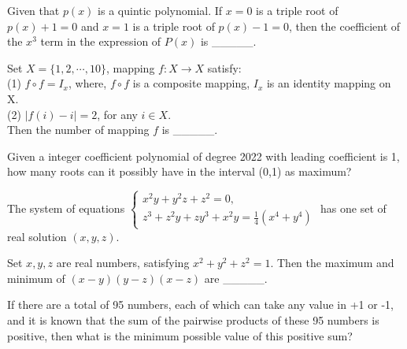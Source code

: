 \begin{problem}\label{AI-Algebra23}
Given that $p(x)$ is a quintic polynomial. If 
$x=0$ is a triple root of $p(x)+1=0$ and $x=1$ is a triple root of $p(x)-1=0$, then the coefficient of the 
$x^3$ term in the expression of $P(x)$ is \_\_\_\_\_.

\end{problem}


\begin{problem}\label{AI-Algebra24}
Set $X=\{1,2,\cdots,10\}$, mapping $f:X\rightarrow X$ satisfy:\\
(1) $f\circ f = I_x$, where, $f\circ f$ is a composite mapping, $I_x$ is an identity mapping on X.\\
(2) $|f(i)-i|=2$, for any $i\in X$.\\
Then the number of mapping $f$ is \_\_\_\_\_.
\end{problem}



\begin{problem}\label{AI-Algebra25}
Given a integer coefficient polynomial of degree 2022 with leading coefficient is 1, how many roots can it possibly have in the interval (0,1) as maximum?
\end{problem}


\begin{problem}\label{AI-Algebra26}
The system of equations $\left\{\begin{array}{l}x^{2} y+y^{2} z+z^{2}=0, \\ z^{3}+z^{2} y+z y^{3}+x^{2} y=\frac{1}{4}\left(x^{4}+y^{4}\right)\end{array}\right.$ has one set of real solution $(x,y,z)$.
\end{problem}



\begin{problem}\label{AI-Algebra28}
Set $x, y, z$ are real numbers, satisfying $x^{2}+y^{2}+z^{2}=1$. Then the maximum and minimum of  $(x-y)(y-z)(x-z)$ are \_\_\_\_\_.
\end{problem}


\begin{problem}\label{AI-Algebra29}
If there are a total of 95 numbers, each of which can take any value in +1 or -1, and it is known that the sum of the pairwise products of these 95 numbers is positive, then what is the minimum possible value of this positive sum?

\end{problem}


